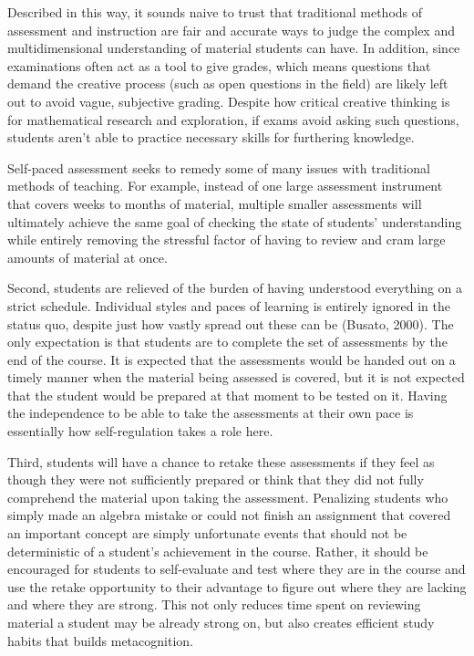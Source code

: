 Described in this way, it sounds naive to trust that traditional methods of assessment and instruction are fair and accurate ways to judge the complex and multidimensional understanding of material students can have. In addition, since examinations often act as a tool to give grades, which means questions that demand the creative process (such as open questions in the field) are likely left out to avoid vague, subjective grading. Despite how critical creative thinking is for mathematical research and exploration, if exams avoid asking such questions, students aren't able to practice necessary skills for furthering knowledge.

Self-paced assessment seeks to remedy some of many issues with traditional methods of teaching. For example, instead of one large assessment instrument that covers weeks to months of material, multiple smaller assessments will ultimately achieve the same goal of checking the state of students' understanding while entirely removing the stressful factor of having to review and cram large amounts of material at once.

Second, students are relieved of the burden of having understood everything on a strict schedule. Individual styles and paces of learning is entirely ignored in the status quo, despite just how vastly spread out these can be (Busato, 2000). The only expectation is that students are to complete the set of assessments by the end of the course. It is expected that the assessments would be handed out on a timely manner when the material being assessed is covered, but it is not expected that the student would be prepared at that moment to be tested on it. Having the independence to be able to take the assessments at their own pace is essentially how self-regulation takes a role here.

Third, students will have a chance to retake these assessments if they feel as though they were not sufficiently prepared or think that they did not fully comprehend the material upon taking the assessment. Penalizing students who simply made an algebra mistake or could not finish an assignment that covered an important concept are simply unfortunate events that should not be deterministic of a student's achievement in the course. Rather, it should be encouraged for students to self-evaluate and test where they are in the course and use the retake opportunity to their advantage to figure out where they are lacking and where they are strong. This not only reduces time spent on reviewing material a student may be already strong on, but also creates efficient study habits that builds metacognition.

